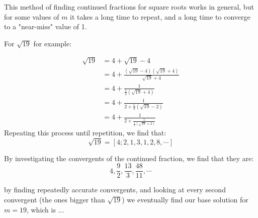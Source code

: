 \documentclass{article}
\begin{document}
This method of finding continued fractions for square roots works in general, but for some values of $m$ it takes a long time to repeat, and a long time to converge to a "near-miss" value of 1.

For $\sqrt{19}$ for example:

\begin{align*}
    \sqrt{19} &= 4 + \sqrt{19} -4 \\
    &= 4 + \frac{(\sqrt{19}-4)(\sqrt{19}+4)}{\sqrt{19}+4} \\
    &= 4 + \frac{1}{\frac{1}{3}(\sqrt{19}+4)} \\
    &= 4 + \frac{1}{2 + \frac{1}{3}(\sqrt{19} - 2) } \\
    &= 4 + \frac{1}{2 + \frac{1}{\frac{1}{5}(\sqrt{19} + 2)}}
\end{align*}
Repeating this process until repetition, we find that:
\[ \sqrt{19} = [4;2,1,3,1,2,8,\cdots] \]

By investigating the convergents of the continued fraction, we find that they are:
\[ 4,\frac{9}{2},\frac{13}{3}, \frac{48}{11}, \cdots \]

by finding repeatedly accurate convergents, and looking at every second convergent (the ones bigger than $ \sqrt{19}$) we eventually find our base solution for $m=19$, which is ...
\end{document}
